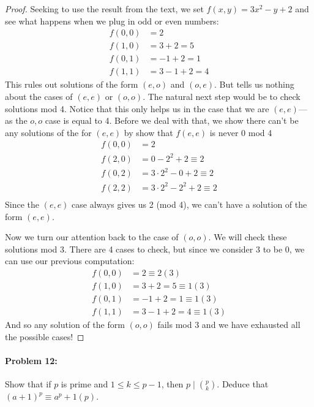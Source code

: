 \begin{proof}
  Seeking to use the result from the text, we set \(f(x,y) = 3x^2-y+2\) and
  see what happens when we plug in odd or even numbers:
  \begin{align*}
    f(0,0) &= 2 \\
    f(1,0) &= 3+2=5 \\
    f(0,1) &= -1+2=1 \\
    f(1,1) &= 3-1+2=4
  \end{align*}
  This rules out solutions of the form \((e,o)\) and \((o,e)\). But tells us
  nothing about the cases of \((e,e)\) or \((o,o)\). The natural next step would
  be to check solutions mod 4. Notice that this only helps us in the case that
  we are \((e,e)\)---as the \(o,o\) case is equal to 4. Before we deal with
  that, we show there can't be any solutions of the for \((e,e)\) by show that
  \(f(e,e)\) is never 0 mod 4
  \begin{align*}
    f(0,0) &= 2\\
    f(2,0) &= 0-2^2+2 \equiv 2 \\
    f(0,2) &= 3\cdot 2^2-0+2 \equiv 2 \\
    f(2,2) &= 3\cdot 2^2-2^2+2 \equiv 2 \\
  \end{align*}
  Since the \((e,e)\) case always gives us 2 (mod 4), we can't have a solution
  of the form \((e,e)\).

  Now we turn our attention back to the case of \((o,o)\). We will check these
  solutions mod 3. There are 4 cases to check, but since we consider \(3\) to be
  0, we can use our previous computation:
  \begin{align*}
    f(0,0) &= 2 \equiv 2 (3) \\
    f(1,0) &= 3+2=5 \equiv 1 (3)\\
    f(0,1) &= -1+2=1 \equiv 1 (3)\\
    f(1,1) &= 3-1+2=4\equiv 1 (3)
  \end{align*}
  And so any  solution of the form \((o,o)\) fails mod 3 and we have
  exhausted all the possible cases!
\end{proof}

\paragraph{Problem 12:} Show that if \(p\) is prime and \(1\leq k\leq p-1\),
then \(p \mid  \binom{p}{k}\). Deduce that \((a+1)^p \equiv a^p+1 (p)\).

